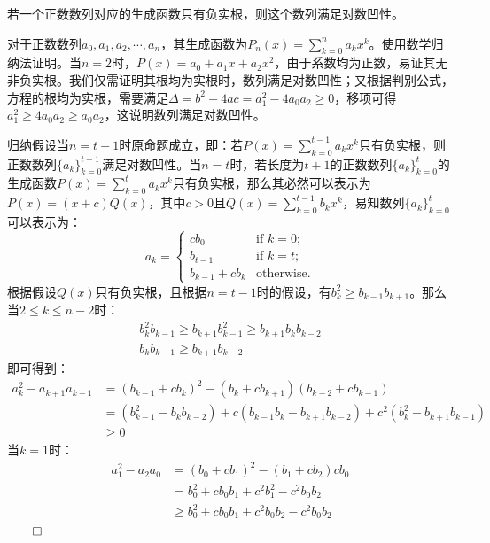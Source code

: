 ﻿\documentclass[11pt]{article}
\newtheorem{lemma}[theorem]{\hskip 1.7em 引理}
\renewenvironment{proof}{{\noindent\hskip 2em \bf 证明 \quad}}{\hfill$\qed$\par}
\begin{document}
    \begin{lemma}
        若一个正数数列对应的生成函数只有负实根，则这个数列满足对数凹性。
    \end{lemma}
    \begin{proof}
        对于正数数列$a_0,a_1,a_2,\cdots,a_n$，其生成函数为$P_n(x)=\sum^{n}_{k=0}a_{k}x^{k}$。使用数学归纳法证明。当$n=2$时，$P(x)=a_0+a_1x+a_2x^2$，由于系数均为正数，易证其无非负实根。我们仅需证明其根均为实根时，数列满足对数凹性；又根据判别公式，方程的根均为实根，需要满足$\Delta = b^2-4ac = a_1^2-4a_0a_2 \geq 0$，移项可得$a_1^2 \geq 4a_0a_2 \geq a_0a_2$，这说明数列满足对数凹性。

        归纳假设当$n=t-1$时原命题成立，即：若$P(x)=\sum^{t-1}_{k=0}a_{k}x^{k}$只有负实根，则正数数列$\{a_k\}_{k=0}^{t-1}$满足对数凹性。当$n=t$时，若长度为$t+1$的正数数列$\{a_k\}_{k=0}^t$的生成函数$P(x)=\sum^{t}_{k=0}a_{k}x^{k}$只有负实根，那么其必然可以表示为$P(x)=(x+c)Q(x)$，其中$c>0$且$Q(x)=\sum^{t-1}_{k=0}b_{k}x^{k}$，易知数列$\{a_k\}_{k=0}^t$可以表示为：
        \[
            a_k=\left\{\begin{array}{cl}
                cb_0 &\textrm{if $k=0$;}\\
                b_{t-1} &\textrm{if $k=t$;}\\
                b_{k-1}+cb_k &\textrm{otherwise.}
            \end{array}\right.
        \]
        根据假设$Q(x)$只有负实根，且根据$n=t-1$时的假设，有$b_k^2 \geq b_{k-1}b_{k+1}$。那么当$2 \leq k \leq n-2$时：
        \begin{gather*}
            b_k^2b_{k-1} \geq b_{k+1}b_{k-1}^2 \geq b_{k+1}b_kb_{k-2}\\
            b_kb_{k-1} \geq b_{k+1}b_{k-2}
        \end{gather*}
        即可得到：
        \begin{align*}
            a_k^2-a_{k+1}a_{k-1}&=(b_{k-1}+cb_k)^2-(b_k+cb_{k+1})(b_{k-2}+cb_{k-1})\\
                &=(b_{k-1}^2-b_kb_{k-2})+c(b_{k-1}b_k-b_{k+1}b_{k-2})+c^2(b_k^2-b_{k+1}b_{k-1})\\
                &\geq 0
        \end{align*}
        当$k=1$时：
        \begin{align*}
            a_1^2-a_2a_0&=(b_0+cb_1)^2-(b_1+cb_2)cb_0\\
                &=b_0^2+cb_0b_1+c^2b_1^2-c^2b_0b_2\\
                &\geq b_0^2+cb_0b_1+c^2b_0b_2-c^2b_0b_2\\

\end{align*}
\end{proof}
\end{document}
